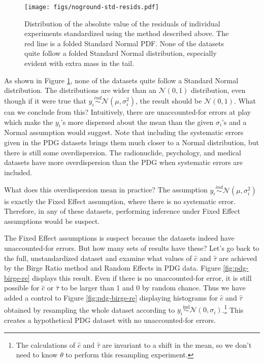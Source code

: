 \documentclass[letterpaper,12pt]{article}
\begin{document}
\begin{figure}[htbp]
\centering
\texttt{[image: figs/noground-std-resids.pdf]}
\caption{Distribution of the absolute value of the residuals of individual experiments standardized using the method described above. The red line is a folded Standard Normal PDF. None of the datasets quite follow a folded Standard Normal distribution, especially evident with extra mass in the tail.}
\label{fig:noground-std-resids}
\end{figure}

As shown in Figure \ref{fig:noground-std-resids}, none of the datasets quite follow a Standard Normal distribution. The distributions are wider than an $\mathcal{N}(0,1)$ distribution, even though if it were true that $y_i\overset{ind}{\sim} \mathcal{N}(\mu,\sigma_i^2)$, the result should be $\mathcal{N}(0,1)$. What can we conclude from this? Intuitively, there are unaccounted-for errors at play which make the $y_i$'s more dispersed about the mean than the given $\sigma_i$'s and a Normal assumption would suggest. Note that including the systematic errors given in the PDG datasets brings them much closer to a Normal distribution, but there is still some overdispersion. The radionuclide, psychology, and medical datasets have more overdispersion than the PDG when systematic errors are included.

What does this overdispersion mean in practice? The assumption $y_i\overset{ind}{\sim} \mathcal{N}(\mu,\sigma_i^2)$ is exactly the Fixed Effect assumption, where there is no systematic error. Therefore, in any of these datasets, performing inference under Fixed Effect assumptions would be suspect.

The Fixed Effect assumptions is suspect because the datasets indeed have unaccounted-for errors. But how many sets of results have these? Let's go back to the full, unstandardized dataset and examine what values of $\hat c$ and $\hat \tau$ are achieved by the Birge Ratio method and Random Effects in PDG data. Figure \ref{fig:pdg-birge-re} displays this result. Even if there is no unaccounted-for error, it is still possible for $\hat c$ or $\hat \tau$ to be larger than 1 and 0 by random chance. Thus we have added a control to Figure \ref{fig:pdg-birge-re} displaying histograms for $\hat c$ and $\hat \tau$ obtained by resampling the whole dataset according to $y_i\overset{\mathrm{ind}}{\sim}\mathcal{N}(0, \sigma_i)$.\footnote{The calculations of $\hat c$ and $\hat \tau$ are invariant to a shift in the mean, so we don't need to know $\theta$ to perform this resampling experiment.} This creates a hypothetical PDG dataset with no unaccounted-for errors.
\end{document}
